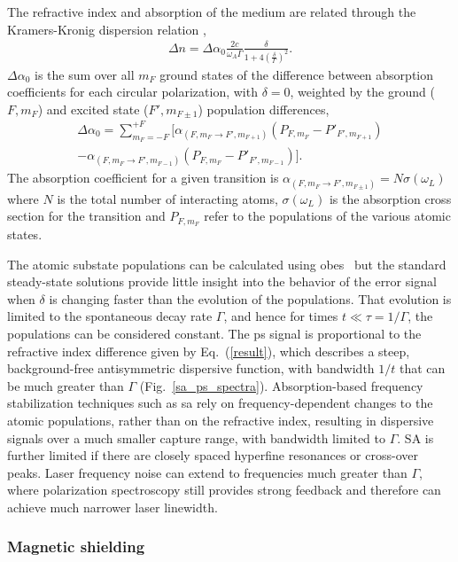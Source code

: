 The refractive index and absorption of the medium are related through the Kramers-Kronig dispersion relation \cite{demtroder_laser_2003},
\begin{align}
\Delta n = \Delta\alpha_0 \frac{2c}{\omega_A \Gamma}\frac{\delta}{1+4\left(\frac{\delta}{\Gamma}\right)^2}.\label{result}
\end{align}
$\Delta\alpha_0$ is the sum over all $m_F$ ground states of the difference between absorption coefficients for each circular polarization, with $\delta=0$, weighted by the ground ($F, m_F$) and excited state ($F', m_{F\pm1}$) population differences,
\begin{align}
\Delta\alpha_0 = \sum_{m_F=-F}^{+F} \big[\alpha_{(F,m_F\rightarrow F',m_{F+1})}(P_{F,m_F}-P'_{F',m_{F+1}})\nonumber\\
-\alpha_{(F,m_F\rightarrow F',m_{F-1})}(P_{F,m_F}-P'_{F',m_{F-1}})\big].
\end{align}
The absorption coefficient for a given transition is $\alpha_{(F, m_F\rightarrow F',m_{F\pm1})}=N \sigma(\omega_L)$ where $N$ is the total number of interacting atoms, $\sigma(\omega_L)$ is the absorption cross section for the transition and $P_{F,m_F}$ refer to the populations of the various atomic states.

The atomic substate populations can be calculated using \glspl*{obe}~\cite{hughes_polarization_2009} but the standard steady-state solutions provide little insight into the behavior of the error signal when $\delta$ is changing faster than the evolution of the populations. That evolution is limited to the spontaneous decay rate $\Gamma$, and hence for times $t\ll \tau=1/\Gamma$, the populations can be considered constant.  The \gls*{ps} signal is proportional to the refractive index difference given by Eq.~(\ref{result}), which describes a steep, background-free antisymmetric dispersive function, with bandwidth $1/t$ that can be much greater than $\Gamma$ (Fig.~\ref{sa_ps_spectra}).  Absorption-based frequency stabilization techniques such as \gls*{sa} rely on frequency-dependent changes to the atomic populations, rather than on the refractive index, resulting in dispersive signals over a much smaller capture range, with bandwidth limited to $\Gamma$. SA is further limited if there are closely spaced hyperfine resonances or cross-over peaks.  Laser frequency noise can extend to frequencies much greater than $\Gamma$, where polarization spectroscopy still provides strong feedback and therefore can achieve much narrower laser linewidth.

\subsubsection{Magnetic shielding}
